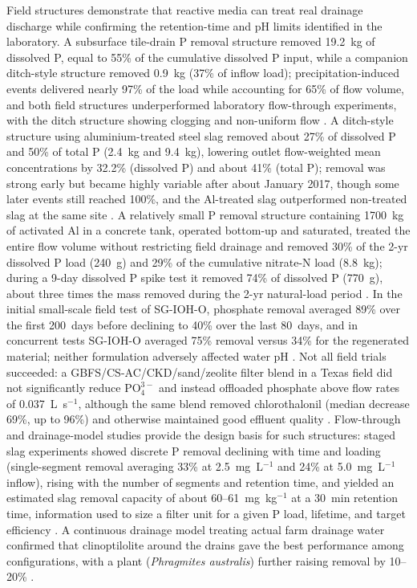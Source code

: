 \documentclass[11pt]{article}
\begin{document}
Field structures demonstrate that reactive media can treat real drainage discharge
while confirming the retention-time and pH limits identified in the laboratory.
A subsurface tile-drain P removal structure removed 19.2~kg of dissolved P,
equal to 55\% of the cumulative dissolved P input, while a companion ditch-style
structure removed 0.9~kg (37\% of inflow load); precipitation-induced events
delivered nearly 97\% of the load while accounting for 65\% of flow volume, and
both field structures underperformed laboratory flow-through experiments, with the
ditch structure showing clogging and non-uniform flow \parencite{Penn2020}. A
ditch-style structure using aluminium-treated steel slag removed about 27\% of
dissolved P and 50\% of total P (2.4~kg and 9.4~kg), lowering outlet flow-weighted
mean concentrations by 32.2\% (dissolved P) and about 41\% (total P); removal was
strong early but became highly variable after about January 2017, though some
later events still reached 100\%, and the Al-treated slag outperformed
non-treated slag at the same site \parencite{Shedekar2020}. A relatively small P
removal structure containing 1700~kg of activated Al in a concrete tank, operated
bottom-up and saturated, treated the entire flow volume without restricting field
drainage and removed 30\% of the 2-yr dissolved P load (240~g) and 29\% of the
cumulative nitrate-N load (8.8~kg); during a 9-day dissolved P spike test it
removed 74\% of dissolved P (770~g), about three times the mass removed during the
2-yr natural-load period \parencite{Penn2024}. In the initial small-scale field
test of SG-IOH-O, phosphate removal averaged 89\% over the first 200~days before
declining to 40\% over the last 80~days, and in concurrent tests SG-IOH-O averaged
75\% removal versus 34\% for the regenerated material; neither formulation
adversely affected water pH \parencite{Allred2017}. Not all field trials succeeded:
a GBFS/CS-AC/CKD/sand/zeolite filter blend in a Texas field did not significantly
reduce $\mathrm{PO_4^{3-}}$ and instead offloaded phosphate above flow rates of
0.037~L~s$^{-1}$, although the same blend removed chlorothalonil (median decrease
69\%, up to 96\%) and otherwise maintained good effluent quality
\parencite{Agrawal2011b}. Flow-through and drainage-model studies provide the
design basis for such structures: staged slag experiments showed discrete P
removal declining with time and loading (single-segment removal averaging 33\% at
2.5~mg~L$^{-1}$ and 24\% at 5.0~mg~L$^{-1}$ inflow), rising with the number of
segments and retention time, and yielded an estimated slag removal capacity of
about 60--61~mg~kg$^{-1}$ at a 30~min retention time, information used to size a
filter unit for a given P load, lifetime, and target efficiency
\parencite{Wang2020d}. A continuous drainage model treating actual farm drainage
water confirmed that clinoptilolite around the drains gave the best performance
among configurations, with a plant (\textit{Phragmites australis}) further raising
removal by 10--20\% \parencite{Sadeghi2021}.
\end{document}
